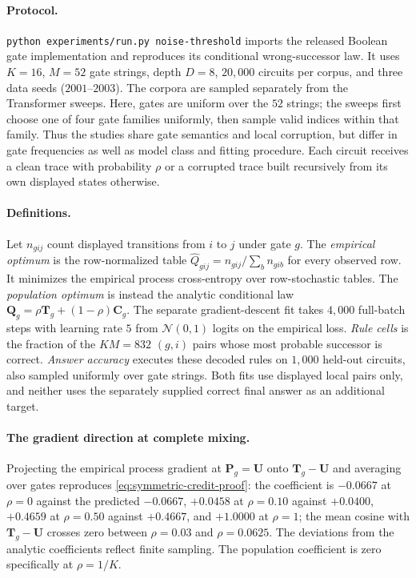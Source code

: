 \paragraph{Protocol.}
\texttt{python experiments/run.py noise-threshold} imports the released Boolean gate
implementation and reproduces its conditional wrong-successor law. It uses
$K=16$, $M=52$ gate strings, depth $D=8$, $20{,}000$ circuits per corpus,
and three data seeds ($2001$--$2003$). The corpora are sampled separately from
the Transformer sweeps. Here, gates are uniform over the $52$ strings; the
sweeps first choose one of four gate families uniformly, then sample valid
indices within that family. Thus the studies share gate semantics and local
corruption, but differ in gate frequencies as well as model class and fitting
procedure. Each circuit receives a clean trace with probability $\rho$ or a
corrupted trace built recursively from its own displayed states otherwise.

\paragraph{Definitions.}
Let $n_{gij}$ count displayed transitions from $i$ to $j$ under gate $g$.
The \emph{empirical optimum} is the row-normalized table
$\widehat Q_{gij}=n_{gij}/\sum_b n_{gib}$ for every observed row. It minimizes
the empirical process cross-entropy over row-stochastic tables. The
\emph{population optimum} is instead the analytic conditional law
$\bm{Q}_g=\rho \bm{T}_g+(1-\rho)\bm{C}_g$. The separate gradient-descent fit takes $4{,}000$
full-batch steps with learning rate $5$ from $\mathcal N(0,1)$ logits on the
empirical loss. \emph{Rule cells} is the fraction of the $KM=832$
$(g,i)$ pairs whose most probable successor is correct. \emph{Answer accuracy}
executes these decoded rules on $1{,}000$ held-out circuits, also sampled
uniformly over gate strings. Both fits use displayed local pairs only, and neither
uses the separately supplied correct final answer as an additional target.

\paragraph{The gradient direction at complete mixing.}
Projecting the empirical process gradient at $\bm{P}_g=\bm{U}$ onto $\bm{T}_g-\bm{U}$ and averaging
over gates reproduces \cref{eq:symmetric-credit-proof}: the coefficient is
$-0.0667$ at $\rho=0$ against the predicted $-0.0667$, $+0.0458$ at $\rho=0.10$
against $+0.0400$, $+0.4659$ at $\rho=0.50$ against $+0.4667$, and $+1.0000$ at
$\rho=1$; the mean cosine with $\bm{T}_g-\bm{U}$ crosses zero between $\rho=0.03$ and
$\rho=0.0625$.  The deviations from the analytic coefficients reflect finite sampling. The
population coefficient is zero specifically at $\rho=1/K$.

